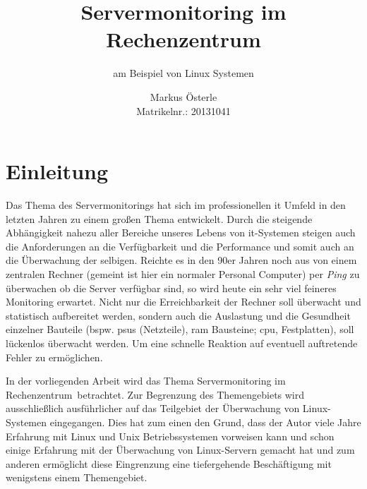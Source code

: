 \documentclass[12pt,a4paper,parskip,listof=totoc,bibliography=totoc]{scrreprt}
\begin{document}
	\subject{Seminararbeit im Studiengang \glqq Verwaltungsinformatik\grqq}
	\author{Markus Österle\\ Matrikelnr.: 20131041}
	\title{Servermonitoring im Rechenzentrum}
	\subtitle{am Beispiel von Linux Systemen}
	\publishers{Betreut von Dipl. Inf. Stefan Müller}
	\date{} %

	\maketitle
	
	\tableofcontents
	\onehalfspacing
	\chapter{Einleitung}
	Das Thema des Servermonitorings hat sich im professionellen \acrshort{it} Umfeld in den letzten Jahren zu einem großen Thema entwickelt. Durch die steigende Abhängigkeit nahezu aller Bereiche unseres Lebens von \acrshort{it}-Systemen steigen auch die Anforderungen an die Verfügbarkeit und die Performance und somit auch an die Überwachung der selbigen. Reichte es in den 90er Jahren noch aus von einem zentralen Rechner (gemeint ist hier ein normaler Personal Computer) per \textit{Ping} zu überwachen ob die Server verfügbar sind, so wird heute ein sehr viel feineres Monitoring erwartet. Nicht nur die Erreichbarkeit der Rechner soll überwacht und statistisch aufbereitet werden, sondern auch die Auslastung und die Gesundheit einzelner Bauteile (bspw. \acrlong{psu}s (Netzteile), \acrshort{ram} Bausteine; \acrshort{cpu}, Festplatten), soll lückenlos überwacht werden. Um eine schnelle Reaktion auf eventuell auftretende Fehler zu ermöglichen. 

	In der vorliegenden Arbeit wird das Thema \glqq Servermonitoring im Rechenzentrum\grqq\ betrachtet. Zur Begrenzung des Themengebiets wird ausschließlich ausführlicher auf das Teilgebiet der Überwachung von Linux-Systemen eingegangen. Dies hat zum einen den Grund, dass der Autor viele Jahre Erfahrung mit Linux und Unix Betriebssystemen vorweisen kann und schon einige Erfahrung mit der Überwachung von Linux-Servern gemacht hat und zum anderen ermöglicht diese Eingrenzung eine tiefergehende Beschäftigung mit wenigstens einem Themengebiet.
\end{document}

